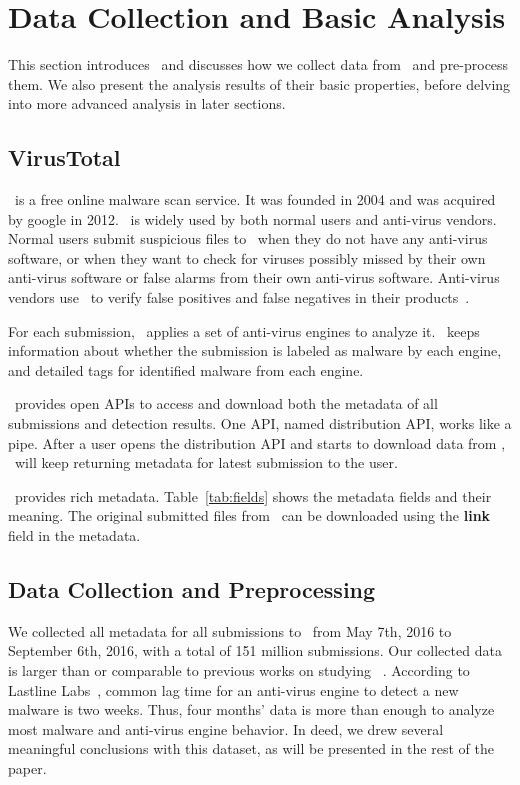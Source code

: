 \section{Data Collection and Basic Analysis}
\label{sec:meth}

This section introduces \vt\ and 
discusses how we collect data from \vt\ and pre-process them.
We also present the analysis results of their basic properties, 
before delving into more advanced analysis in later sections.


\subsection{VirusTotal}
\vt\ is a free online malware scan service.
It was founded in 2004 and was acquired by google in 2012. 
\vt\ is widely used by both normal users and anti-virus vendors.
Normal users submit suspicious files to \vt\ when they do not have any anti-virus software, 
or when they want to check for viruses possibly missed by their own anti-virus software 
or false alarms from their own anti-virus software.  
Anti-virus vendors use \vt\ to verify false positives and false negatives in their products~\cite{huangvt2016bigdata, neeles}.

For each submission, \vt\ applies a set of anti-virus engines to analyze it. 
\vt\ keeps information about whether the submission is labeled as malware by each engine, 
and detailed tags for identified malware from each engine. 

\vt\ provides open APIs to access and download both the metadata of all submissions and detection results.
One API, named distribution API, works like a pipe.
After a user opens the distribution API and starts to download data from \vt, 
\vt\ will keep returning metadata for latest submission to the user. 

\vt\ provides rich metadata.
Table~\ref{tab:fields} shows the metadata fields and their meaning.  
The original submitted files from \vt\ can be downloaded using the {\bf link} field in the metadata.

\subsection{Data Collection and Preprocessing}
We collected all metadata for all submissions to \vt\ from May 7th, 2016 to September 6th, 2016,
with a total of 151 million submissions. 
Our collected data is larger than or comparable to previous works on studying \vt~\cite{SongAPsys2016,huangvt2016bigdata}.
According to Lastline Labs~\cite{Lastline}, common lag time for an anti-virus engine to detect a new malware is two weeks.
Thus, four months' data is more than enough to analyze most malware and anti-virus engine behavior. 
In deed, we drew several meaningful conclusions with this dataset, as will be presented in the rest of the paper.

